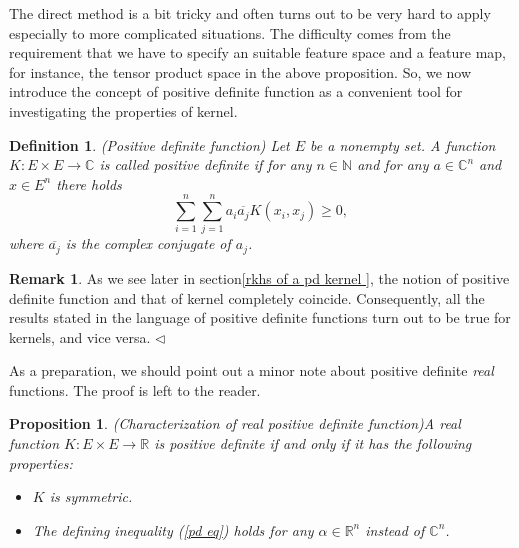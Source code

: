 \documentclass[a4paper,12pt]{article}
\newtheorem{prp}[thm]{Proposition}
\newtheorem{dfn}[thm]{Definition}
\theoremstyle{remark}
\theoremstyle{definition}
\newtheorem{rem}[thm]{Remark}
\theoremstyle{definition}
\theoremstyle{definition}
\newcommand{\fin}{\hfill \( \triangleleft \) }
\begin{document}
The direct method is a bit tricky and often turns out to be very hard to apply especially to more complicated situations. The difficulty comes from the requirement that we have to specify an suitable feature space and a feature map, for instance, the tensor product space in the above proposition. So, we now introduce the concept of positive definite function as a convenient tool for investigating the properties of kernel.
\begin{dfn} (Positive definite function)
	Let \( E \) be a nonempty set.
	A function \( K: E \times E \to \mathbb{C} \) is called positive definite if for any \( n \in \mathbb{N} \) and for any \( a \in \mathbb{C}^n \) and \( x \in E^n \) there holds
	\begin{equation}
		\sum_{i=1}^{n} \sum_{j=1}^{n} a_i \overline{a_j}K(x_i,x_j) \ge 0, \label{pd eq}
	\end{equation}
	where \( \overline{a_j} \) is the complex conjugate of \( a_j \).
\end{dfn}

\begin{rem}
	As we see later in section\ref{rkhs of a pd kernel }, the notion of positive definite function and that of kernel completely coincide. Consequently, all the results stated in the language of positive definite functions turn out to be true for kernels, and vice versa.
	\fin\end{rem}

As a preparation, we should point out a minor note about positive definite \textit{real} functions. The proof is left to the reader.
\begin{prp} (Characterization of real positive definite function)\label{chara real pd}
	A real function \( K:E \times E \to \mathbb{R} \) is positive definite if and only if it has the following properties:
	\begin{itemize}
		\item[(a)] \( K \) is symmetric.
		\item[(b)] The defining inequality (\ref{pd eq}) holds for any \( \alpha \in \mathbb{R}^n \) instead of \( \mathbb{C}^n \).
	\end{itemize}
\end{prp}
\end{document}
